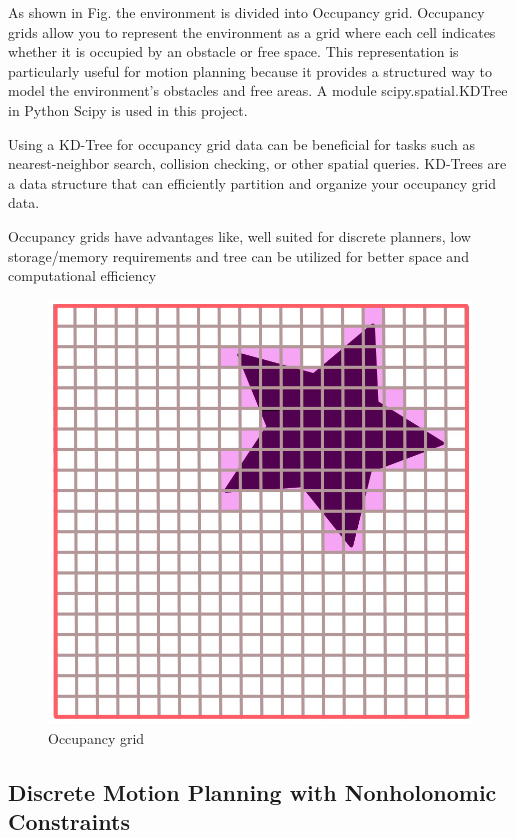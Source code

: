 \documentclass[12pt,a4paper]{article}
\begin{document}
As shown in Fig. the environment is divided into Occupancy grid.
Occupancy grids allow you to represent the environment as a grid where each cell indicates whether it is occupied by an obstacle or free space. This representation is particularly useful for motion planning because it provides a structured way to model the environment's obstacles and free areas. A module scipy.spatial.KDTree in Python Scipy is used in this project. \par
Using a KD-Tree for occupancy grid data can be beneficial for tasks such as nearest-neighbor search, collision checking, or other spatial queries. KD-Trees are a data structure that can efficiently partition and organize your occupancy grid data.\par

Occupancy grids have advantages like, well suited for discrete planners, low storage/memory requirements and tree can be utilized for better space and computational efficiency\par

\begin{figure}[h!]
\begin{center}
\includegraphics[width=0.5\columnwidth]{images/occupancy_grid.jpeg}
\end{center}
\caption{Occupancy grid}
\label{fig:Occupancy_grid}
\end{figure}\par


\subsection{Discrete Motion Planning with Nonholonomic Constraints}\label{sec:kinematic constraints} \par
\end{document}
